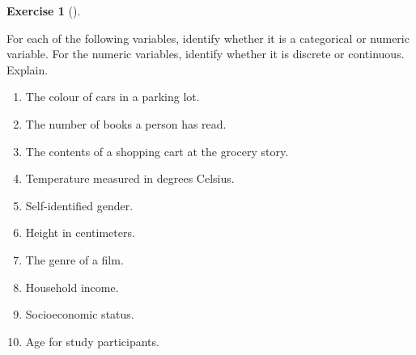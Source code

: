 \documentclass[
  letterpaper,
  DIV=11,
  numbers=noendperiod]{scrreprt}
\providecommand{\tightlist}{%
  \setlength{\itemsep}{0pt}\setlength{\parskip}{0pt}}\usepackage{longtable,booktabs,array}
\theoremstyle{definition}
\newtheorem{exercise}{Exercise}[chapter]
\theoremstyle{definition}
\theoremstyle{definition}
\theoremstyle{remark}
\begin{document}
\begin{exercise}[]\protect\hypertarget{exr-10.4}{}\label{exr-10.4}

For each of the following variables, identify whether it is a
categorical or numeric variable. For the numeric variables, identify
whether it is discrete or continuous. Explain.

\begin{enumerate}
\def\labelenumi{\alph{enumi}.}
\tightlist
\item
  The colour of cars in a parking lot.
\item
  The number of books a person has read.
\item
  The contents of a shopping cart at the grocery story.
\item
  Temperature measured in degrees Celsius.
\item
  Self-identified gender.
\item
  Height in centimeters.
\item
  The genre of a film.
\item
  Household income.
\item
  Socioeconomic status.
\item
  Age for study participants.
\end{enumerate}

\end{exercise}
\end{document}
